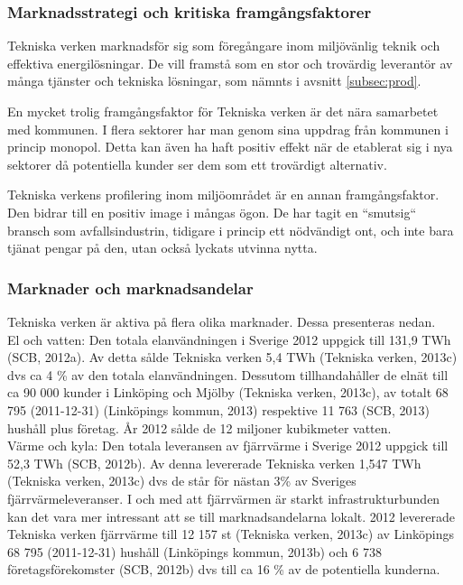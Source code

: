 \documentclass[10pt,a4paper]{article}
\begin{document}
\subsubsection{Marknadsstrategi och kritiska framgångsfaktorer} \label{subsec:kff}
Tekniska verken marknadsför sig som föregångare inom miljövänlig teknik och
effektiva energilösningar. De vill framstå som en stor och trovärdig leverantör 
av många tjänster och tekniska lösningar, som nämnts i avsnitt \ref{subsec:prod}. 

En mycket trolig framgångsfaktor för Tekniska verken är det nära samarbetet med
kommunen. I flera sektorer har man genom sina uppdrag från kommunen i princip
monopol. Detta kan även ha haft positiv effekt när de etablerat sig i nya
sektorer då potentiella kunder ser dem som ett trovärdigt alternativ. 

Tekniska verkens profilering inom miljöområdet är en annan framgångsfaktor. Den
bidrar till en positiv image i mångas ögon. De har tagit en ``smutsig`` bransch
som avfallsindustrin, tidigare i princip ett nödvändigt ont, och inte bara tjänat 
pengar på den, utan också lyckats utvinna nytta.

\subsubsection{Marknader och marknadsandelar}
Tekniska verken är aktiva på flera olika marknader. Dessa presenteras nedan.\\

El och vatten: Den totala elanvändningen i Sverige 2012 uppgick till 131,9 TWh (SCB, 2012a). Av detta sålde Tekniska verken 5,4 TWh (Tekniska verken, 2013c) dvs ca 4 \% av den totala elanvändningen. Dessutom tillhandahåller de elnät  till ca 90 000 kunder i Linköping och Mjölby (Tekniska verken, 2013c), av totalt 68 795 (2011-12-31) (Linköpings kommun, 2013) respektive 11 763 (SCB, 2013) hushåll plus företag. År 2012 sålde de 12 miljoner kubikmeter vatten. \\

Värme och kyla: Den totala leveransen av fjärrvärme i Sverige 2012 uppgick till 52,3 TWh (SCB, 2012b). Av denna levererade Tekniska verken 1,547 TWh (Tekniska verken, 2013c) dvs de står för nästan 3\% av Sveriges fjärrvärmeleveranser. I och med att fjärrvärmen är starkt infrastrukturbunden kan det vara mer intressant att se till marknadsandelarna lokalt. 2012 levererade Tekniska verken fjärrvärme till 12 157 st (Tekniska verken, 2013c) av Linköpings 68 795 (2011-12-31) hushåll (Linköpings kommun, 2013b) och 6 738 företagsförekomster (SCB, 2012b) dvs till ca 16 \% av de potentiella kunderna.\\
\end{document}
